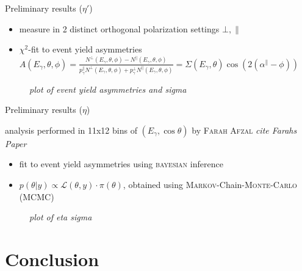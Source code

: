 \documentclass[11pt,aspectratio=169,dvipsnames]{beamer}
\newcommand{\thecolor}{black!70!blue}
\begin{document}
\begin{frame}{Preliminary results ($\eta'$)}
\begin{tcolorbox}[colback=blue!5,colframe=\thecolor,title={Method}]
	\begin{itemize}
		\item measure in 2 distinct orthogonal polarization settings $\bot,\parallel$
		\item $\chi^2$-fit to event yield asymmetries $A(E_\gamma,\theta,\phi)=\frac{N^\bot(E_\gamma,\theta,\phi)-N^\parallel(E_\gamma,\theta,\phi)}{p_\gamma^\parallel N^\bot(E_\gamma,\theta,\phi) + p_\gamma^\bot N^\parallel(E_\gamma,\theta,\phi)}=\Sigma(E_\gamma,\theta)\cos\left(2\left(\alpha^\parallel-\phi\right)\right)$
	\end{itemize}
\end{tcolorbox}
\begin{figure}
	\centering
	\emph{plot of event yield asymmetries and sigma}
\end{figure}
\end{frame}
\begin{frame}{Preliminary results ($\eta$)}
	\begin{minipage}{.49\linewidth}
\begin{tcolorbox}[colback=blue!5,colframe=\thecolor,title={Event selection ($\eta$)}]
	analysis performed in 11x12 bins of $(E_\gamma,\cos\theta)$ by \textsc{Farah Afzal} \emph{cite Farahs Paper}
\end{tcolorbox}
	\end{minipage}
	\begin{minipage}{.49\linewidth}
\begin{tcolorbox}[colback=blue!5,colframe=\thecolor,title={Method}]
	\begin{itemize}
		\item fit to event yield asymmetries using \textsc{bayesian} inference
		\item $p(\theta|y)\propto\mathcal{L}(\theta,y)\cdot\pi(\theta)$, obtained using \textsc{Markov}-Chain-\textsc{Monte-Carlo} (MCMC)
	\end{itemize}
\end{tcolorbox}
	\end{minipage}
	
	\begin{figure}
		\centering
		\emph{plot of eta sigma}
	\end{figure}
\end{frame}


\section{Conclusion}
\end{document}
